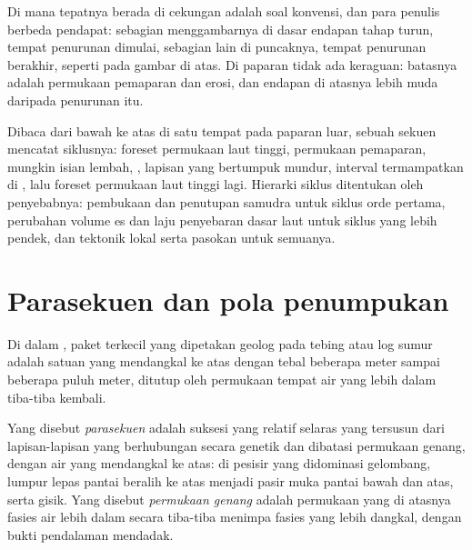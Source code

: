 Di mana tepatnya  berada di cekungan adalah soal konvensi, dan
para penulis berbeda pendapat: sebagian menggambarnya di dasar endapan tahap turun, tempat
penurunan dimulai, sebagian lain di puncaknya, tempat penurunan berakhir, seperti pada gambar di atas.
Di paparan tidak ada keraguan: batasnya adalah permukaan pemaparan
dan erosi, dan endapan di atasnya lebih muda daripada penurunan itu.

Dibaca dari bawah ke atas di satu tempat pada paparan luar, sebuah sekuen mencatat
siklusnya: foreset permukaan laut tinggi, permukaan pemaparan, mungkin isian lembah,
, lapisan yang bertumpuk mundur, interval termampatkan di
, lalu foreset permukaan laut tinggi lagi. Hierarki
siklus ditentukan oleh penyebabnya: pembukaan dan penutupan samudra
untuk siklus orde pertama, perubahan volume es dan laju penyebaran dasar laut
untuk siklus yang lebih pendek, dan tektonik lokal serta pasokan untuk
semuanya.

\section{Parasekuen dan pola penumpukan}\label{sec:b3:sequence-stratigraphy:parasequences}

Di dalam , paket terkecil yang dipetakan geolog pada tebing atau
log sumur adalah satuan yang mendangkal ke atas dengan tebal beberapa meter sampai
beberapa puluh meter, ditutup oleh permukaan tempat air yang lebih dalam tiba-tiba kembali.

\begin{definition}\label{def:b3:sequence-stratigraphy:parasequence}
Yang disebut \emph{parasekuen} adalah suksesi yang relatif selaras
yang tersusun dari lapisan-lapisan yang berhubungan secara genetik dan dibatasi permukaan genang,
dengan air yang mendangkal ke atas: di pesisir yang didominasi gelombang, lumpur lepas pantai beralih ke atas
menjadi pasir muka pantai bawah dan atas, serta gisik. Yang disebut \emph{permukaan
genang} adalah permukaan yang di atasnya fasies air lebih dalam
secara tiba-tiba menimpa fasies yang lebih dangkal, dengan bukti pendalaman mendadak.
\end{definition}

